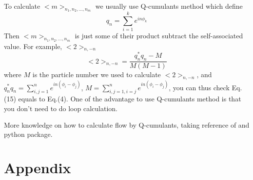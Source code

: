 \documentclass{article}
\begin{document}
\quad To calculate $<m>_{n_1,n_2,...,n_m}$ we usually use Q-cumulants method which define
\begin{equation}
q_n = \sum_{i=1}^{k} e^{in\phi_k}
\end{equation}
Then $<m>_{n_1,n_2,...,n_m}$ is just some of their product subtract the self-associated value. For example, $<2>_{n,-n}$
\begin{equation}
<2>_{n,-n} = \frac{q_n^{*}q_n-M}{M(M-1)}
\end{equation}
where $M$ is the particle number we used to calculate $<2>_{n,-n}$, and  $q_n^{*}q_n = \sum_{i,j=1}^{n} e^{in(\phi_i-\phi_j)}$, $M = \sum_{i,j=1,i=j}^{n} e^{in(\phi_i-\phi_j)}$, you can thus check Eq.(15) equals to Eq.(4). One of the advantage to use Q-cumulants method is that you don't need to do loop calculation.

More knowledge on how to calculate flow by Q-cumulants, taking reference of \cite{bilandzic2011flow}\cite{bilandzic2012anisotropic} and python package\cite{Duckhic}\cite{myhic}.




\appendix
\section{Appendix}
\end{document}
